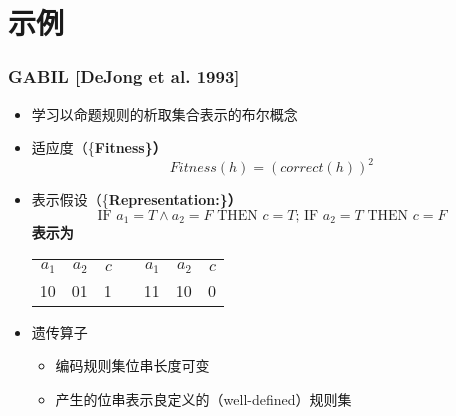 \documentclass{beamer}
\begin{document}
\section{示例}
\label{sec-4}
\begin{frame}
\frametitle{GABIL [DeJong et al. 1993]}
\label{sec-4-1}

\begin{itemize}
\item 学习以命题规则的析取集合表示的布尔概念
\item 适应度（\{\bf Fitness\}）
  \[ Fitness(h) = (correct(h))^2 \]
\item 表示假设（\{\bf Representation:\}）
   \[\mbox{IF  } a_{1} = T \land a_{2}=F \mbox{\ THEN\ } c = T 
   \mbox{; \ IF  } a_{2} = T  \mbox{\  THEN\  } c = F  \]
    表示为

\begin{center}
\begin{tabular}{rrrlrrr}
 $a_{1}$  &  $a_{2}$  &  $c$  &     &  $a_{1}$  &  $a_{2}$  &  $c$  \\
      10  &       01  &    1  &     &       11  &       10  &    0  \\
\end{tabular}
\end{center}


\item 遗传算子
\begin{itemize}
\item 编码规则集位串长度可变
\item 产生的位串表示良定义的（well-defined）规则集
\end{itemize}
\end{itemize}
\end{frame}
\end{document}
